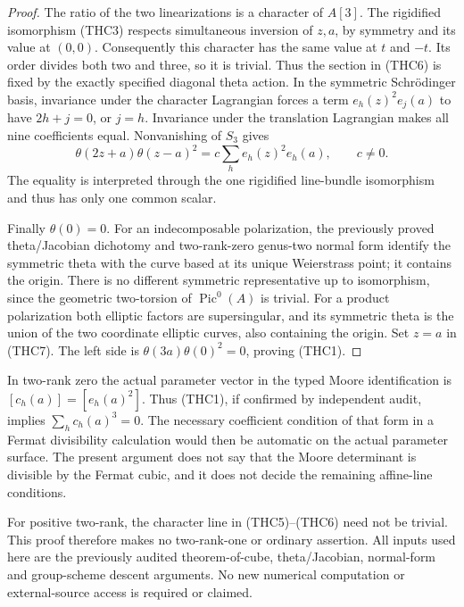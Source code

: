 \begin{proof}
The ratio of the two linearizations is a character of \(A[3]\).
The rigidified isomorphism (THC3) respects simultaneous inversion
of \(z,a\), by symmetry and its value at \((0,0)\).  Consequently
this character has the same value at \(t\) and \(-t\).  Its
order divides both two and three, so it is trivial.  Thus the
section in (THC6) is fixed by the exactly specified diagonal
theta action.  In the symmetric Schr\"odinger basis, invariance
under the character Lagrangian forces a term
\(e_h(z)^2e_j(a)\) to have \(2h+j=0\), or \(j=h\).
Invariance under the translation Lagrangian makes all nine
coefficients equal.  Nonvanishing of \(S_3\) gives
\[
       \theta(2z+a)\theta(z-a)^2
                =c\sum_h e_h(z)^2e_h(a),\qquad c\ne0.
                                                        \tag{THC7}
\]
The equality is interpreted through the one rigidified line-bundle
isomorphism and thus has only one common scalar.

Finally \(\theta(0)=0\).  For an indecomposable polarization,
the previously proved theta/Jacobian dichotomy and two-rank-zero
genus-two normal form identify the symmetric theta with the curve
based at its unique Weierstrass point; it contains the origin.
There is no different symmetric representative up to isomorphism,
since the geometric two-torsion of \(\operatorname{Pic}^0(A)\)
is trivial.  For a product polarization both elliptic factors are
supersingular, and its symmetric theta is the union of the two
coordinate elliptic curves, also containing the origin.  Set
\(z=a\) in (THC7).  The left side is
\(\theta(3a)\theta(0)^2=0\), proving (THC1).
\end{proof}

\begin{remark}
\label{rem:f0-theta-Hermitian-containment-scope}
In two-rank zero the actual parameter vector in the typed Moore
identification is \([c_h(a)]=[e_h(a)^2]\).  Thus (THC1), if
confirmed by independent audit, implies \(\sum_h c_h(a)^3=0\).
The necessary coefficient condition of that form in a Fermat
divisibility calculation would then be automatic on the actual
parameter surface.  The present argument does not say that the
Moore determinant is divisible by the Fermat cubic, and it does
not decide the remaining affine-line conditions.

For positive two-rank, the character line in (THC5)--(THC6) need
not be trivial.  This proof therefore makes no two-rank-one or
ordinary assertion.  All inputs used here are the previously
audited theorem-of-cube, theta/Jacobian, normal-form and
group-scheme descent arguments.  No new numerical computation
or external-source access is required or claimed.
\end{remark}
